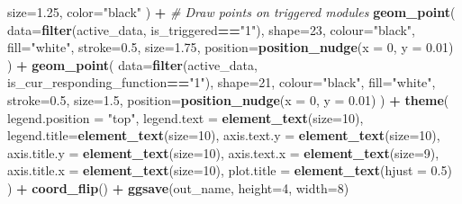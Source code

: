 \documentclass[]{book}
\newenvironment{Shaded}{\begin{snugshade}}{\end{snugshade}}
\newcommand{\CommentTok}[1]{\textcolor[rgb]{0.56,0.35,0.01}{\textit{#1}}}
\newcommand{\DataTypeTok}[1]{\textcolor[rgb]{0.13,0.29,0.53}{#1}}
\newcommand{\DecValTok}[1]{\textcolor[rgb]{0.00,0.00,0.81}{#1}}
\newcommand{\FloatTok}[1]{\textcolor[rgb]{0.00,0.00,0.81}{#1}}
\newcommand{\KeywordTok}[1]{\textcolor[rgb]{0.13,0.29,0.53}{\textbf{#1}}}
\newcommand{\NormalTok}[1]{#1}
\newcommand{\OperatorTok}[1]{\textcolor[rgb]{0.81,0.36,0.00}{\textbf{#1}}}
\newcommand{\StringTok}[1]{\textcolor[rgb]{0.31,0.60,0.02}{#1}}
\begin{document}
\begin{Shaded}
\begin{Highlighting}[]
    \DataTypeTok{size=}\FloatTok{1.25}\NormalTok{,}
    \DataTypeTok{color=}\StringTok{"black"}
\NormalTok{  ) }\OperatorTok{+}
\StringTok{  }\CommentTok{# Draw points on triggered modules}
\StringTok{  }\KeywordTok{geom_point}\NormalTok{(}
    \DataTypeTok{data=}\KeywordTok{filter}\NormalTok{(active_data, is_triggered}\OperatorTok{==}\StringTok{"1"}\NormalTok{),}
    \DataTypeTok{shape=}\DecValTok{23}\NormalTok{,}
    \DataTypeTok{colour=}\StringTok{"black"}\NormalTok{,}
    \DataTypeTok{fill=}\StringTok{"white"}\NormalTok{,}
    \DataTypeTok{stroke=}\FloatTok{0.5}\NormalTok{,}
    \DataTypeTok{size=}\FloatTok{1.75}\NormalTok{,}
    \DataTypeTok{position=}\KeywordTok{position_nudge}\NormalTok{(}\DataTypeTok{x =} \DecValTok{0}\NormalTok{, }\DataTypeTok{y =} \FloatTok{0.01}\NormalTok{)}
\NormalTok{  ) }\OperatorTok{+}
\StringTok{  }\KeywordTok{geom_point}\NormalTok{(}
    \DataTypeTok{data=}\KeywordTok{filter}\NormalTok{(active_data, is_cur_responding_function}\OperatorTok{==}\StringTok{"1"}\NormalTok{),}
    \DataTypeTok{shape=}\DecValTok{21}\NormalTok{,}
    \DataTypeTok{colour=}\StringTok{"black"}\NormalTok{,}
    \DataTypeTok{fill=}\StringTok{"white"}\NormalTok{,}
    \DataTypeTok{stroke=}\FloatTok{0.5}\NormalTok{,}
    \DataTypeTok{size=}\FloatTok{1.5}\NormalTok{,}
    \DataTypeTok{position=}\KeywordTok{position_nudge}\NormalTok{(}\DataTypeTok{x =} \DecValTok{0}\NormalTok{, }\DataTypeTok{y =} \FloatTok{0.01}\NormalTok{)}
\NormalTok{  ) }\OperatorTok{+}
\StringTok{  }\KeywordTok{theme}\NormalTok{(}
    \DataTypeTok{legend.position =} \StringTok{"top"}\NormalTok{,}
    \DataTypeTok{legend.text =} \KeywordTok{element_text}\NormalTok{(}\DataTypeTok{size=}\DecValTok{10}\NormalTok{),}
    \DataTypeTok{legend.title=}\KeywordTok{element_text}\NormalTok{(}\DataTypeTok{size=}\DecValTok{10}\NormalTok{),}
    \DataTypeTok{axis.text.y =} \KeywordTok{element_text}\NormalTok{(}\DataTypeTok{size=}\DecValTok{10}\NormalTok{),}
    \DataTypeTok{axis.title.y =} \KeywordTok{element_text}\NormalTok{(}\DataTypeTok{size=}\DecValTok{10}\NormalTok{),}
    \DataTypeTok{axis.text.x =} \KeywordTok{element_text}\NormalTok{(}\DataTypeTok{size=}\DecValTok{9}\NormalTok{),}
    \DataTypeTok{axis.title.x =} \KeywordTok{element_text}\NormalTok{(}\DataTypeTok{size=}\DecValTok{10}\NormalTok{),}
    \DataTypeTok{plot.title =} \KeywordTok{element_text}\NormalTok{(}\DataTypeTok{hjust =} \FloatTok{0.5}\NormalTok{)}
\NormalTok{  ) }\OperatorTok{+}
\StringTok{  }\KeywordTok{coord_flip}\NormalTok{() }\OperatorTok{+}
\StringTok{  }\KeywordTok{ggsave}\NormalTok{(out_name, }\DataTypeTok{height=}\DecValTok{4}\NormalTok{, }\DataTypeTok{width=}\DecValTok{8}\NormalTok{)}
\end{Highlighting}
\end{Shaded}
\end{document}
